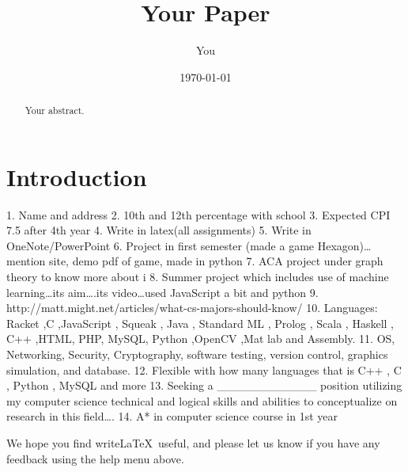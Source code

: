 \documentclass[a4paper]{article}
\title{Your Paper}
\author{You}
\date{\today}
\begin{document}
\maketitle

\begin{abstract}
Your abstract.
\end{abstract}

\section{Introduction}

1.	Name and address
2.	10th and 12th percentage with school
3.	Expected CPI 7.5 after 4th year
4.	Write in latex(all assignments)
5.	Write in OneNote/PowerPoint
6.	Project in first semester (made a game Hexagon)…mention site, demo pdf of game, made in python
7.	ACA project under graph theory to know more about i
8.	Summer project which includes use of machine learning…its aim….its video…used JavaScript a bit and python
9.	http://matt.might.net/articles/what-cs-majors-should-know/
10.	Languages: Racket ,C ,JavaScript , Squeak , Java , Standard ML , Prolog , Scala , Haskell , C++ ,HTML, PHP, MySQL, Python ,OpenCV ,Mat lab and Assembly.
11.	OS, Networking, Security, Cryptography, software testing, version control, graphics simulation, and database.
12.	Flexible with how many languages that is C++ , C , Python , MySQL and more
13.	 Seeking a ____________ position utilizing my computer science technical and logical skills and abilities to conceptualize on research in this field….
14.	A* in computer science course in 1st year

We hope you find write\LaTeX\ useful, and please let us know if you have any feedback using the help menu above.
\end{document}
